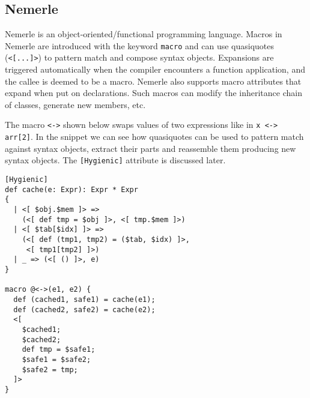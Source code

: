 \documentclass[10pt,journal,a4paper]{IEEEtran}
\begin{document}
\subsection{Nemerle}

Nemerle is an object-oriented/functional programming language.
Macros in Nemerle are introduced with the keyword \small \texttt{macro} \normalsize
and can use quasiquotes (\small \texttt{<[...]>}\normalsize) to pattern match
and compose syntax objects. Expansions are triggered automatically when
the compiler encounters a function application, and the callee is deemed to be a macro.
Nemerle also supports macro attributes that expand when put on declarations.
Such macros can modify the inheritance chain of classes, generate new members, etc.

The macro \small \texttt{<->} \normalsize shown below swaps values of two expressions
like in \small \texttt{x <-> arr[2]}\normalsize. In the snippet we can see how quasiquotes
can be used to pattern match against syntax objects, extract their parts and reassemble them
producing new syntax objects. The \small \texttt{[Hygienic]} \normalsize attribute is discussed later.

\small
\begin{verbatim}
[Hygienic]
def cache(e: Expr): Expr * Expr
{
  | <[ $obj.$mem ]> =>
    (<[ def tmp = $obj ]>, <[ tmp.$mem ]>)
  | <[ $tab[$idx] ]> =>
    (<[ def (tmp1, tmp2) = ($tab, $idx) ]>,
     <[ tmp1[tmp2] ]>)
  | _ => (<[ () ]>, e)
}

macro @<->(e1, e2) {
  def (cached1, safe1) = cache(e1);
  def (cached2, safe2) = cache(e2);
  <[
    $cached1;
    $cached2;
    def tmp = $safe1;
    $safe1 = $safe2;
    $safe2 = tmp;
  ]>
}
\end{verbatim}
\normalsize

\end{document}
